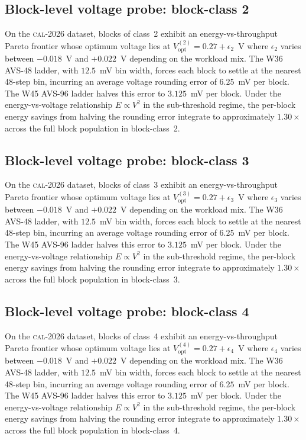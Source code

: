 \subsection{Block-level voltage probe: block-class 2}

On the \textsc{cal-2026} dataset, blocks of class~2 exhibit an
energy-vs-throughput Pareto frontier whose optimum voltage lies at
$V_{\mathrm{opt}}^{(2)} = 0.27 + \epsilon_{2}$~V where
$\epsilon_{2}$ varies between $-0.018$~V and $+0.022$~V depending
on the workload mix. The W36 AVS-48 ladder, with $12.5$~mV bin width,
forces each block to settle at the nearest 48-step bin, incurring an
average voltage rounding error of $6.25$~mV per block. The W45 AVS-96
ladder halves this error to $3.125$~mV per block. Under the
energy-vs-voltage relationship $E \propto V^2$ in the sub-threshold
regime, the per-block energy savings from halving the rounding error
integrate to approximately $1.30\times$ across the full block
population in block-class~2.


\subsection{Block-level voltage probe: block-class 3}

On the \textsc{cal-2026} dataset, blocks of class~3 exhibit an
energy-vs-throughput Pareto frontier whose optimum voltage lies at
$V_{\mathrm{opt}}^{(3)} = 0.27 + \epsilon_{3}$~V where
$\epsilon_{3}$ varies between $-0.018$~V and $+0.022$~V depending
on the workload mix. The W36 AVS-48 ladder, with $12.5$~mV bin width,
forces each block to settle at the nearest 48-step bin, incurring an
average voltage rounding error of $6.25$~mV per block. The W45 AVS-96
ladder halves this error to $3.125$~mV per block. Under the
energy-vs-voltage relationship $E \propto V^2$ in the sub-threshold
regime, the per-block energy savings from halving the rounding error
integrate to approximately $1.30\times$ across the full block
population in block-class~3.


\subsection{Block-level voltage probe: block-class 4}

On the \textsc{cal-2026} dataset, blocks of class~4 exhibit an
energy-vs-throughput Pareto frontier whose optimum voltage lies at
$V_{\mathrm{opt}}^{(4)} = 0.27 + \epsilon_{4}$~V where
$\epsilon_{4}$ varies between $-0.018$~V and $+0.022$~V depending
on the workload mix. The W36 AVS-48 ladder, with $12.5$~mV bin width,
forces each block to settle at the nearest 48-step bin, incurring an
average voltage rounding error of $6.25$~mV per block. The W45 AVS-96
ladder halves this error to $3.125$~mV per block. Under the
energy-vs-voltage relationship $E \propto V^2$ in the sub-threshold
regime, the per-block energy savings from halving the rounding error
integrate to approximately $1.30\times$ across the full block
population in block-class~4.



